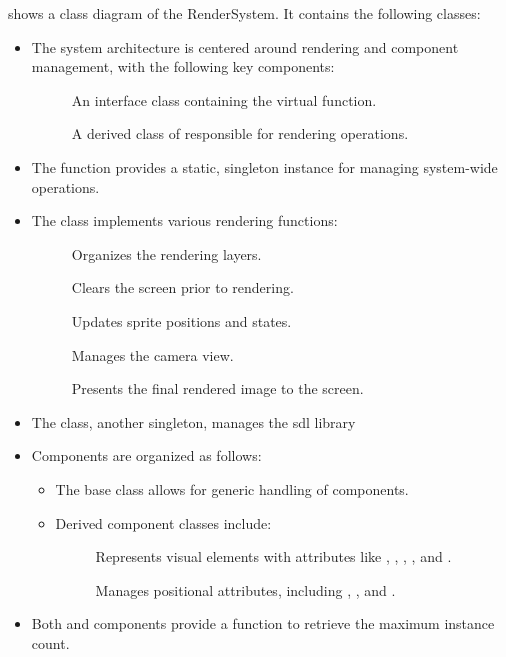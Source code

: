\documentclass{projdoc}
\begin{document}
 shows a class diagram of the RenderSystem. It contains the
following classes:\noparbreak
\begin{itemize}
	\item The system architecture is centered around rendering and component
		management, with the following key components:\noparbreak
		\begin{description}
			\item[] An interface class containing the virtual
				 function.
			\item[] A derived class of 
				responsible for rendering operations.
		\end{description}
	\item The  function provides a static, singleton
		instance for managing system-wide operations.
	\item The  class implements various rendering
		functions:\noparbreak
		\begin{description}
			\item[] Organizes the rendering layers.
			\item[] Clears the screen prior to rendering.
			\item[] Updates sprite positions and states.
			\item[] Manages the camera view.
			\item[] Presents the final rendered image to the
				screen.
		\end{description}
	\item The  class, another singleton, manages the \gls{sdl} library
	\item Components are organized as follows:\noparbreak
		\begin{itemize}
			\item The  base class allows for generic handling of
				components.
			\item Derived component classes include:\noparbreak
				\begin{description}
					\item[] Represents visual elements with attributes like
						, , ,
						, and .
					\item[] Manages positional attributes, including
						, , and .
				\end{description}
		\end{itemize}
	\item Both  and  components provide a
		 function to retrieve the maximum instance count.
\end{itemize}
\end{document}
